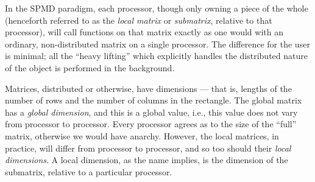 In the SPMD paradigm, each processor, though only owning a piece of the whole (henceforth referred to as the \emph{local matrix} or \emph{submatrix}, relative to that processor), will call functions on that matrix exactly as one would with an ordinary, non-distributed matrix on a single processor.  The difference for the user is minimal; all the ``heavy lifting'' which explicitly handles the distributed nature of the object is performed in the background.

Matrices, distributed or otherwise, have dimensions --- that is, lengths of the number of rows and the number of columns in the rectangle.  The global matrix has a \emph{global dimension}, and this is a global value, i.e., this value does not vary from processor to processor.  Every processor agrees as to the size of the ``full'' matrix, otherwise we would have anarchy.  However, the local matrices, in practice, will differ from processor to processor, and so too should their \emph{local dimensions}.  A local dimension, as the name implies, is the dimension of the submatrix, relative to a particular processor.

